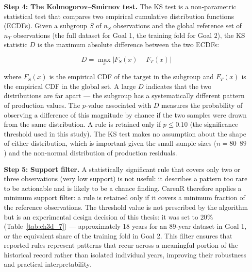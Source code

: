 \textbf{Step 4: The Kolmogorov--Smirnov test. }The KS test is a non-parametric statistical test that compares two empirical cumulative distribution functions (ECDFs). Given a subgroup $S$ of $n_S$ observations and the global reference set of $n_T$ observations (the full dataset for Goal 1, the training fold for Goal 2), the KS statistic $D$ is the maximum absolute difference between the two ECDFs:

\begin{equation}
  D = \max_{x} \left| F_S(x) - F_T(x) \right|
  \label{eq:ks}
\end{equation}

where $F_S(x)$ is the empirical CDF of the target in the subgroup and $F_T(x)$ is the empirical CDF in the global set. A large $D$ indicates that the two distributions are far apart --- the subgroup has a systematically different pattern of production values. The $p$-value associated with $D$ measures the probability of observing a difference of this magnitude by chance if the two samples were drawn from the same distribution. A rule is retained only if $p \leq 0.10$ (the significance threshold used in this study). The KS test makes no assumption about the shape of either distribution, which is important given the small sample sizes ($n = 80$--$89$) and the non-normal distribution of production residuals.

\textbf{Step 5: Support filter. }A statistically significant rule that covers only two or three observations (very low support) is not useful: it describes a pattern too rare to be actionable and is likely to be a chance finding. CarenR therefore applies a minimum support filter: a rule is retained only if it covers a minimum fraction of the reference observations. The threshold value is not prescribed by the algorithm but is an experimental design decision of this thesis: it was set to 20\% (Table~\ref{tab:ch3d_7}) --- approximately 18 years for an 89-year dataset in Goal 1, or the equivalent share of the training fold in Goal 2. This filter ensures that reported rules represent patterns that recur across a meaningful portion of the historical record rather than isolated individual years, improving their robustness and practical interpretability.

